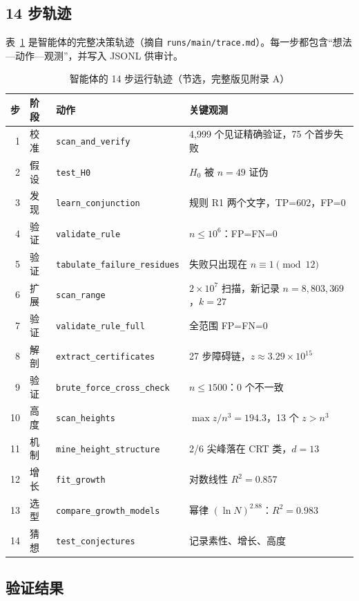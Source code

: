\documentclass[11pt,a4paper]{ctexart}
\theoremstyle{definition}
\theoremstyle{remark}
\begin{document}
\subsection{14 步轨迹}

表~\ref{tab:trace} 是智能体的完整决策轨迹（摘自
\texttt{runs/main/trace.md}）。每一步都包含“想法—动作—观测”，并写入
JSONL 供审计。

\begin{table}[H]
\centering
\caption{智能体的 14 步运行轨迹（节选，完整版见附录 A）}
\label{tab:trace}
\small
\begin{tabularx}{\textwidth}{@{}r l l X@{}}
\toprule
步 & 阶段 & 动作 & 关键观测 \\
\midrule
1 & 校准 & \texttt{scan\_and\_verify} & 4{,}999 个见证精确验证，75 个首步失败 \\
2 & 假设 & \texttt{test\_H0} & $H_0$ 被 $n=49$ 证伪 \\
3 & 发现 & \texttt{learn\_conjunction} & 规则 R1 两个文字，TP=602，FP=0 \\
4 & 验证 & \texttt{validate\_rule} & $n\le10^6$：FP=FN=0 \\
5 & 验证 & \texttt{tabulate\_failure\_residues} & 失败只出现在 $n\equiv1\pmod{12}$ \\
6 & 扩展 & \texttt{scan\_range} & $2\times10^7$ 扫描，新记录 $n=8{,}803{,}369$，$k=27$ \\
7 & 验证 & \texttt{validate\_rule\_full} & 全范围 FP=FN=0 \\
8 & 解剖 & \texttt{extract\_certificates} & 27 步障碍链，$z\approx3.29\times10^{15}$ \\
9 & 验证 & \texttt{brute\_force\_cross\_check} & $n\le1500$：0 个不一致 \\
10 & 高度 & \texttt{scan\_heights} & $\max z/n^3=194.3$，13 个 $z>n^3$ \\
11 & 机制 & \texttt{mine\_height\_structure} & 2/6 尖峰落在 CRT 类，$d=13$ \\
12 & 增长 & \texttt{fit\_growth} & 对数线性 $R^2=0.857$ \\
13 & 选型 & \texttt{compare\_growth\_models} & 幂律 $(\ln N)^{2.88}$：$R^2=0.983$ \\
14 & 猜想 & \texttt{test\_conjectures} & 记录素性、增长、高度 \\ 
\bottomrule
\end{tabularx}
\end{table}

\subsection{验证结果}
\end{document}
